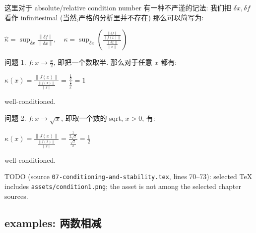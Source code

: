 这里对于 absolute/relative condition number 有一种不严谨的记法: 我们把 \(\delta x,\delta f\) 看作 infinitesimal (当然,严格的分析里并不存在) 那么可以简写为:

\(\widehat{\kappa} = \sup_{\delta x}\frac{\left\| {\delta f} \right\|}{\left\| {\delta x} \right\|},\quad\kappa = \sup_{\delta x}\left( \frac{\frac{\left\| {\delta f} \right\|}{\left\| {f(x)} \right\|}}{\frac{\left\| {\delta x} \right\|}{\left\| x \right\|}} \right)\)

\begin{example}

问题 1. \(f:x\rightarrow\frac{x}{2}\), 即把一个数取半. 那么对于任意 \(x\) 都有:

\(\kappa(x) = \frac{\left\| {J(x)} \right\|}{\frac{\left\| {f(x)} \right\|}{\left\| x \right\|}} = \frac{\frac{1}{2}}{\frac{\frac{x}{2}}{x}} = 1\)

well-conditioned.

问题 2. \(f:x\rightarrow\sqrt{x}\), 即取一个数的 sqrt, \(x > 0\), 有:

\(\kappa(x) = \frac{\left\| {J(x)} \right\|}{\frac{\left\| {f(x)} \right\|}{\left\| x \right\|}} = \frac{\frac{1}{2\sqrt{x}}}{\frac{\sqrt{x}}{x}} = \frac{1}{2}\)

well-conditioned.

TODO (source \texttt{07-conditioning-and-stability.tex}, lines 70--73): selected TeX includes \texttt{assets/condition1.png}; the asset is not among the selected chapter sources.

\end{example}

\subsection{examples: 两数相减}


